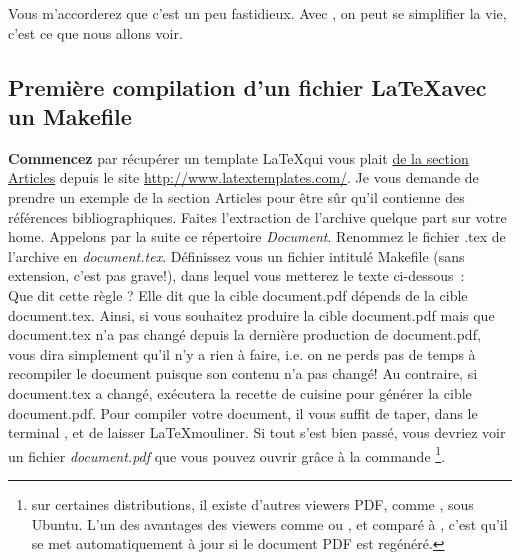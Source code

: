 \begin{center}
\end{center}
Vous m'accorderez que c'est un peu fastidieux. Avec \make, on peut se simplifier la vie, c'est ce que nous allons voir.\\

\subsection{Première compilation d'un fichier \LaTeX avec un Makefile}

\textbf{Commencez} par récupérer un template \LaTeX qui vous plait \underline{de la section Articles} depuis le site \url{http://www.latextemplates.com/}. Je vous demande de prendre un exemple de la section Articles pour être sûr qu'il contienne des références bibliographiques. Faites l'extraction de l'archive quelque part sur votre home. Appelons par la suite ce répertoire \emph{Document}. Renommez le fichier .tex de l'archive en \emph{document.tex}. Définissez vous un fichier intitulé Makefile (sans extension, c'est pas grave!), dans lequel vous metterez le texte ci-dessous~:\\
\cprotect{}
Que dit cette règle ? Elle dit que la cible document.pdf dépends de la cible document.tex. Ainsi, si vous souhaitez produire la cible document.pdf mais que document.tex n'a pas changé depuis la dernière production de document.pdf, \make vous dira simplement qu'il n'y a rien à faire, i.e. on ne perds pas de temps à recompiler le document puisque son contenu n'a pas changé! Au contraire, si document.tex a changé, \make exécutera la recette de cuisine pour générer la cible document.pdf. Pour compiler votre document, il vous suffit de taper, dans le terminal ,  et de laisser \LaTeX mouliner. Si tout s'est bien passé, vous devriez voir un fichier \emph{document.pdf} que vous pouvez ouvrir grâce à la commande \footnote{sur certaines distributions, il existe d'autres viewers PDF, comme \okular, sous Ubuntu. L'un des avantages des viewers comme \okular ou \evince, et comparé à \acroread, c'est qu'il se met automatiquement à jour si le document PDF est regénéré.}.\\

